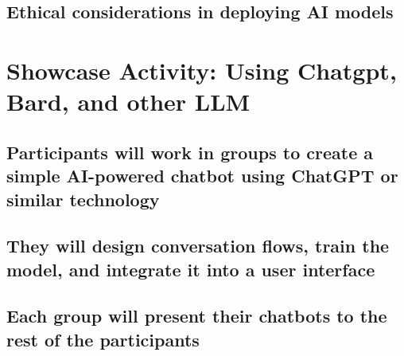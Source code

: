 \documentclass[
]{book}
\begin{document}
\hypertarget{ethical-considerations-in-deploying-ai-models}{%
\section*{Ethical considerations in deploying AI models}\label{ethical-considerations-in-deploying-ai-models}}

\hypertarget{showcase-activity-using-chatgpt-bard-and-other-llm}{%
\chapter*{Showcase Activity: Using Chatgpt, Bard, and other LLM}\label{showcase-activity-using-chatgpt-bard-and-other-llm}}

\hypertarget{participants-will-work-in-groups-to-create-a-simple-ai-powered-chatbot-using-chatgpt-or-similar-technology}{%
\section*{Participants will work in groups to create a simple AI-powered chatbot using ChatGPT or similar technology}\label{participants-will-work-in-groups-to-create-a-simple-ai-powered-chatbot-using-chatgpt-or-similar-technology}}

\hypertarget{they-will-design-conversation-flows-train-the-model-and-integrate-it-into-a-user-interface}{%
\section*{They will design conversation flows, train the model, and integrate it into a user interface}\label{they-will-design-conversation-flows-train-the-model-and-integrate-it-into-a-user-interface}}

\hypertarget{each-group-will-present-their-chatbots-to-the-rest-of-the-participants}{%
\section*{Each group will present their chatbots to the rest of the participants}\label{each-group-will-present-their-chatbots-to-the-rest-of-the-participants}}
\end{document}
